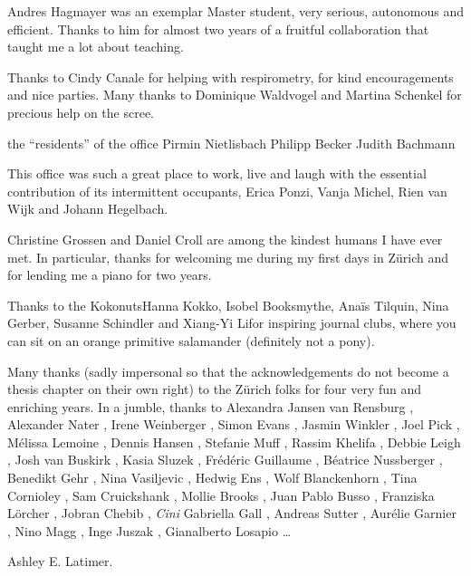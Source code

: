 Andres Hagmayer was an exemplar Master student, very serious, autonomous and efficient. Thanks to him for almost two years of a fruitful collaboration that taught me a lot about teaching. 

Thanks to Cindy Canale for helping with respirometry, for kind encouragements and nice parties. 
Many thanks to Dominique Waldvogel and Martina Schenkel for precious help on the scree. 


the ``residents'' of the office
Pirmin Nietlisbach
Philipp Becker
Judith Bachmann

This office was such a great place to work, live and laugh with the essential contribution of its intermittent occupants,
Erica Ponzi, 
Vanja Michel, 
Rien van Wijk and 
Johann Hegelbach.

Christine Grossen and Daniel Croll are among the kindest humans I have ever met. In particular, thanks for welcoming me during my first days in Z\"urich and for lending me a piano for two years.

Thanks to the Kokonuts\textemdash Hanna Kokko, Isobel Booksmythe, Ana\"is Tilquin, Nina Gerber, Susanne Schindler and Xiang-Yi Li\textemdash for inspiring journal clubs, where you can sit on an orange primitive salamander (definitely not a pony).

Many thanks (sadly impersonal so that the acknowledgements do not become a thesis chapter on their own right) to the Z\"urich folks for four very fun and enriching years. In a jumble, thanks to 
Alexandra Jansen van Rensburg 
, Alexander Nater
, Irene Weinberger
, Simon Evans
, Jasmin Winkler
, Joel Pick
, M\'elissa Lemoine
, Dennis Hansen
, Stefanie Muff
, Rassim Khelifa
, Debbie Leigh
, Josh van Buskirk 
, Kasia Sluzek
, Fr\'ed\'eric Guillaume
, Béatrice Nussberger
, Benedikt Gehr	
, Nina Vasiljevic
, Hedwig Ens
, Wolf Blanckenhorn
, Tina Cornioley
, Sam Cruickshank
, Mollie Brooks
, Juan Pablo Busso
, Franziska L\"orcher
, Jobran Chebib
, \emph{Cini} Gabriella Gall
, Andreas Sutter
, Aur\'elie Garnier
, Nino Magg
, Inge Juszak
, Gianalberto Losapio
\dots




Ashley E. Latimer.

